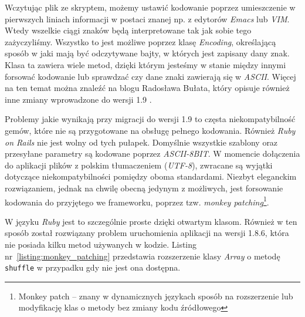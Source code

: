\documentclass[12pt,twoside]{report}
\begin{document}
\begin{listing}
  
  \caption{Kodowanie znaków w różnych wersjach języka Ruby}
  \label{listing:mb_chars}
\end{listing}


Wczytując plik ze skryptem, możemy ustawić kodowanie poprzez umieszczenie w pierwszych
liniach informacji w postaci znanej np. z edytorów \emph{Emacs} lub \emph{VIM}. Wtedy
wszelkie ciągi znaków będą interpretowane tak jak sobie tego zażyczyliśmy. Wszystko to
jest możliwe poprzez klasę \emph{Encoding}, określającą sposób w jaki mają być
odczytywane bajty, w których jest zapisany dany znak. Klasa ta zawiera wiele metod, dzięki
którym jesteśmy w stanie między innymi forsować kodowanie lub sprawdzać czy dane znaki zawierają się w
\emph{ASCII}. Więcej na ten temat można znaleźć na blogu Radosława Bułata, który opisuje
również inne zmiany wprowadzone do wersji 1.9 \cite{radarek}.


Problemy jakie wynikają przy migracji do wersji 1.9 to częsta niekompatybilność gemów,
które nie są przygotowane na obsługę pełnego kodowania. Również \emph{Ruby on Rails} nie
jest wolny od tych pułapek. Domyślnie wszystkie szablony oraz przesyłane parametry są
kodowane poprzez \emph{ASCII-8BIT}. W momencie dołączenia do aplikacji plików z polskim
tłumaczeniem (\emph{UTF-8}), zwracane są wyjątki dotyczące niekompatybilności pomiędzy
oboma standardami. Niezbyt eleganckim rozwiązaniem, jednak na chwilę obecną jedynym z możliwych,
jest forsowanie kodowania do przyjętego we frameworku, poprzez tzw.
\emph{monkey patching}\footnote{Monkey patch -- znany w dynamicznych językach sposób na
rozszerzenie lub modyfikację klas o metody bez zmiany kodu źródłowego}.


W języku \emph{Ruby} jest to szczególnie proste dzięki otwartym klasom. Również w ten
sposób został rozwiązany problem uruchomienia aplikacji na wersji 1.8.6, która nie
posiada kilku metod używanych w kodzie. Listing nr~\ref{listing:monkey_patching}
przedstawia rozszerzenie klasy \emph{Array} o metodę \texttt{shuffle} w przypadku gdy nie
jest ona dostępna.

\begin{listing}
  
  \caption{Monkey patching umożliwiający uruchomienie aplikacji na wersji 1.8.6 języka Ruby}
  \label{listing:monkey_patching}
\end{listing}


\cleardoublepage


\end{document}
